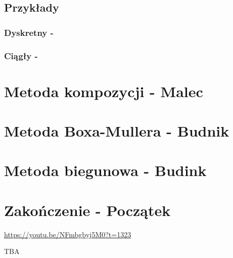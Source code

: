 \documentclass[12pt]{mwrep}
\begin{document}
	\subsection{Przykłady}
	\subsubsection{Dyskretny - }
	\subsubsection{Ciągły - }
	
	\section{Metoda kompozycji - Malec}




	
	\section{Metoda Boxa-Mullera - Budnik}
	
	\section{Metoda biegunowa - Budink}



	
	\section{Zakończenie - Początek}
	
	
	\begin{thebibliography}{1}
		\url{https://youtu.be/NFmbgbyj5M0?t=1323}
		
		TBA

	\end{thebibliography}
	
\end{document}
